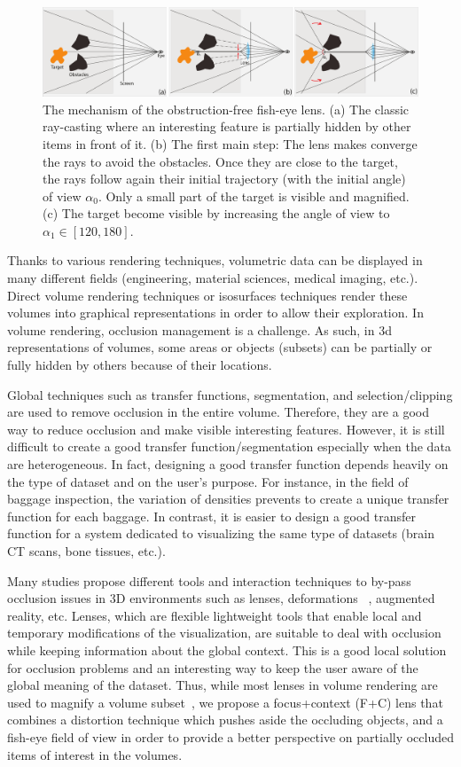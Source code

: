 \begin{figure} 
\includegraphics [width=\textwidth]{images/principle.pdf} 
\caption{The mechanism of the obstruction-free fish-eye lens. (a) The classic ray-casting where an interesting feature is partially hidden by other items in front of it. (b) The first main step: The lens makes converge the rays to avoid the obstacles. Once they are close to the target, the rays follow again their initial trajectory (with the initial angle) of view $\alpha_0$. Only a small part of the target is visible and magnified. (c) The target become visible by increasing the angle of view to $\alpha_1 \in \left[120,180\right]$.   }
\label{f:fisheye}
\end{figure}


Thanks to various rendering techniques, volumetric data can be displayed in many different fields (engineering, material sciences, medical imaging, etc.). Direct volume rendering techniques or isosurfaces techniques render these volumes into graphical representations in order to allow their exploration. In volume rendering, occlusion management is a challenge. As such, in 3d representations of volumes, some areas or objects (subsets) can be partially or fully hidden by others because of their locations.

Global techniques such as transfer functions,  segmentation, and selection/clipping are used to remove occlusion in the entire volume. Therefore, they are a good way to reduce occlusion and make visible interesting features.  However, it is still difficult to create a good transfer function/segmentation  especially when the data are heterogeneous. In fact, designing a good transfer function depends heavily on the type of dataset and on the user's purpose. For instance, in the field of baggage inspection, the variation of densities prevents to create a unique transfer function for each baggage. In contrast, it is easier to design a good transfer function for a system dedicated to visualizing the same type of datasets (brain CT scans, bone tissues, etc.). 

Many studies propose different tools and interaction techniques to by-pass occlusion issues in 3D environments such as lenses, deformations ~\cite{595268}, augmented reality, etc. Lenses, which are flexible lightweight tools that enable local and temporary modifications of the visualization, are suitable to deal with occlusion while keeping information about the global context. This is a good local solution for occlusion problems and an interesting way to keep the user aware of the global meaning of the dataset. Thus, while most lenses in volume rendering are used to magnify a volume subset~\cite{CGF:CGF12871}, we propose a focus+context (F+C) lens that combines a distortion technique which pushes aside the occluding objects, and a  fish-eye field of view in order to provide a better perspective on partially occluded items of interest in the volumes.  


